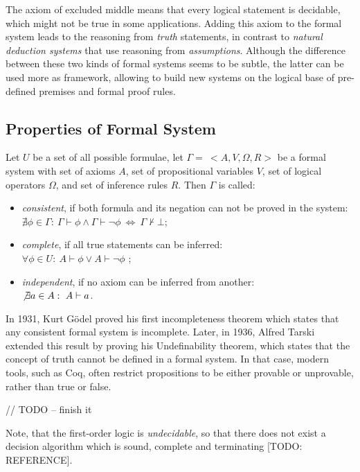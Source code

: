 \documentclass[article]{aaltoseries}
\begin{document}
The axiom of excluded middle means that every logical statement is decidable, which might not be true in some applications. Adding this axiom to the formal system leads to the reasoning from \textit{truth} statements, in contrast to \textit{natural deduction systems} that use reasoning from \textit{assumptions}. Although the difference between these two kinds of formal systems seems to be subtle, the latter can be used more as framework, allowing to build new systems on the logical base of pre-defined premises and formal proof rules. %

\subsection{Properties of Formal System}
\label{sec:properties}

Let $U$ be a set of all possible formulae, let $\Gamma = \ <A, V, \Omega, R>$ be a formal system with set of axioms $A$, set of propositional variables $V$, set of logical operators $\Omega$, and set of inference rules $R$. Then $\Gamma$ is called:
\begin{itemize}
	\itemsep0em
	\item \textit{consistent}, if both formula and its negation can not be proved in the system: \\
		$\nexists \phi \in \Gamma: \ \Gamma \vdash \phi \land \Gamma \vdash \neg \phi  \ \Leftrightarrow \ \Gamma \nvdash \bot$;
	\item \textit{complete}, if all true statements can be inferred: \\
		$\forall \phi \in U: \ A \vdash \phi \lor A \vdash \neg \phi$ ;
	\item \textit{independent}, if no axiom can be inferred from another: \\
		$\not \exists a \in A: \ A \vdash a$.
\end{itemize}

In 1931, Kurt Gödel proved his first incompleteness theorem which states that any consistent formal system is incomplete. Later, in 1936, Alfred Tarski extended this result by proving his Undefinability theorem, which states that the concept of truth cannot be defined in a formal system. %
In that case, modern tools, such as Coq, often restrict propositions to be either provable or unprovable, rather than true or false.


// TODO -- finish it


Note, that the first-order logic is \textit{undecidable}, so that there does not exist a decision algorithm which is sound, complete and terminating [TODO: REFERENCE]. %
\end{document}
